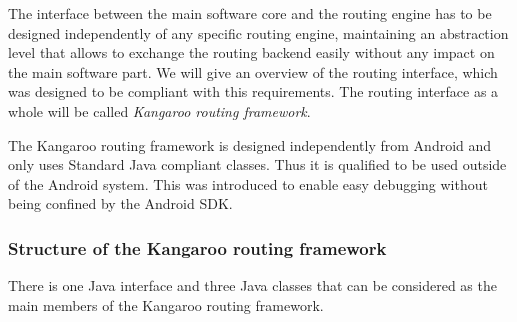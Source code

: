 The interface between the main software core and the routing engine has to be designed independently of any specific routing engine, maintaining an abstraction level that allows to exchange the routing backend easily without any impact on the main software part. We will give an overview of the routing interface, which was designed to be compliant with this requirements. The routing interface as a whole will be called \emph{Kangaroo routing framework}.\newline

The Kangaroo routing framework is designed independently from Android and only uses Standard Java compliant classes. Thus it is qualified to be used outside of the Android system. This was introduced to enable easy debugging without being confined by the Android SDK.

\subsubsection{Structure of the Kangaroo routing framework}

There is one Java interface and three Java classes that can be considered as the main members of the Kangaroo routing framework.

